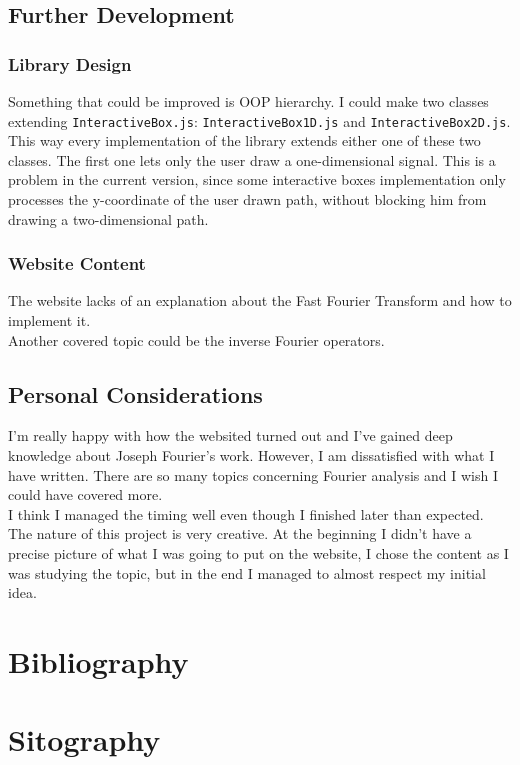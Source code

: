 \documentclass{article}
\begin{document}
\subsection{Further Development}

\subsubsection{Library Design}

Something that could be improved is OOP hierarchy. I could make
two classes extending \texttt{InteractiveBox.js}: \texttt{InteractiveBox1D.js} and
\texttt{InteractiveBox2D.js}. This way every implementation of the library extends either
one of these two classes. The first one lets only the user draw a one-dimensional signal.
This is a problem in the current version, since some interactive boxes implementation only processes
the y-coordinate of the user drawn path, without blocking him from drawing a two-dimensional path.

\subsubsection{Website Content}

The website lacks of an explanation about the Fast Fourier Transform and how to implement it.
\\
Another covered topic could be the inverse Fourier operators.

\subsection{Personal Considerations}

I'm really happy with how the websited turned out and I've gained deep knowledge about Joseph Fourier's work.
However, I am dissatisfied with what I have written. There are so many topics concerning Fourier analysis and I wish I could have covered more.
\\
I think I managed the timing well even though I finished later than expected.
\\
The nature of this project is very creative. At the beginning I didn't have a precise picture of what I was going to
put on the website, I chose the content as I was studying the topic, but in the end I managed to almost respect my initial idea.

\section{Bibliography}

\section{Sitography}
\end{document}
